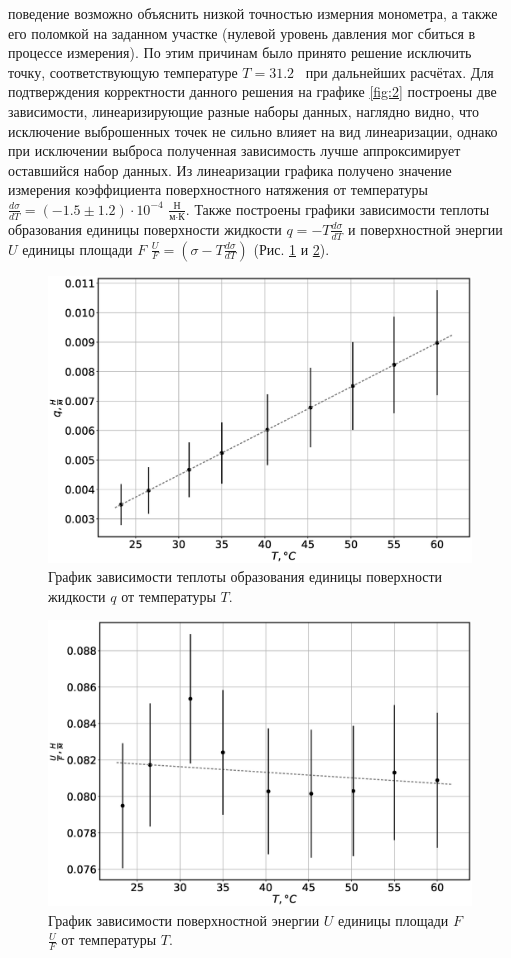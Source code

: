 \documentclass[a4paper,12pt]{report}
\begin{document}
\begin{multicols}{2}
поведение возможно объяснить низкой точностью измерния монометра, а также его поломкой на заданном 
участке (нулевой уровень давления мог сбиться в процессе измерения). По этим причинам было принято решение 
исключить точку, соответствующую температуре $T = 31.2$ \textcelsius \, при дальнейших расчётах. 
Для подтверждения корректности данного решения на графике \ref{fig:2} построены две зависимости, 
линеаризирующие разные наборы данных, наглядно видно, что исключение выброшенных точек не сильно 
влияет на вид линеаризации, однако при исключении выброса полученная зависимость лучше аппроксимирует 
оставшийся набор данных.
Из линеаризации графика получено значение измерения коэффициента поверхностного натяжения от температуры 
$\frac{d\sigma }{dT} = (-1.5 \pm 1.2) \cdot 10 ^ {-4}$ $\frac{\text{Н}}{\text{м}\cdot\text{К}}$. Также построены 
графики зависимости теплоты образования единицы поверхности жидкости $q = -T \frac{d \sigma}{d T}$ и 
поверхностной энергии $U$ единицы площади $F$ $\frac{U}{F} = \left( \sigma - T \frac{d \sigma }{d T} \right) $ (Рис. \ref{fig:3} и \ref{fig:4}).
\begin{figure}[H]
    \centering
    \includegraphics[width=0.7\linewidth]{qT.eps}
    \caption{График зависимости теплоты образования единицы поверхности жидкости $q$ от температуры $T$.}
    \label{fig:3}
\end{figure}
\begin{figure}[H]
    \centering
    \includegraphics[width=0.7\linewidth]{qUF.eps}
    \caption{График зависимости поверхностной энергии $U$ единицы площади $F$ $\frac{U}{F}$ от температуры $T$.}
    \label{fig:4}
\end{figure}


\end{multicols}
\end{document}

